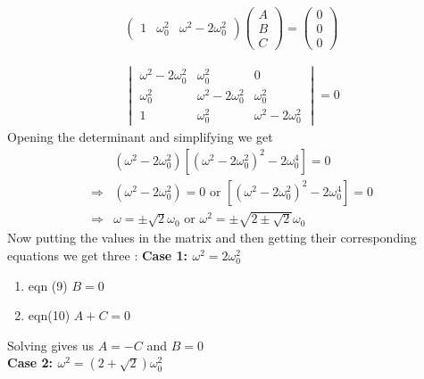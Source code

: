 \documentclass[addpoints]{exam}
\begin{document}
\begin{questions}
\begin{solution}
\begin{align*}
\begin{pmatrix}
            1 & \omega _{0}^{2} & \omega ^{2} -2\omega _{0}^{2}
        \end{pmatrix} 
        \begin{pmatrix}
            A\\
            B\\
            C
        \end{pmatrix}=
        \begin{pmatrix}
            0\\
            0\\
            0
        \end{pmatrix}
        \\ \\ \\
        \begin{vmatrix}
            \omega ^{2} -2\omega _{0}^{2} & \omega _{0}^{2} & 0\\
            \omega _{0}^{2} & \omega ^{2} -2\omega _{0}^{2} & \omega _{0}^{2}\\
            1 & \omega _{0}^{2} & \omega ^{2} -2\omega _{0}^{2}
        \end{vmatrix} =0
    \end{align*}
    Opening the determinant and simplifying we get 
    \begin{align*}
        &(\omega^2-2\omega_0^2)[(\omega^2-2\omega_0^2)^2-2\omega_0^4] = 0\\ 
        \Rightarrow & (\omega^2-2\omega_0^2)=0 \text{  or  } [(\omega^2-2\omega_0^2)^2-2\omega_0^4] = 0\\ 
        \Rightarrow & \omega=\pm\sqrt{2}\omega_0 \text{  or  } \omega^2=\pm \sqrt{2\pm\sqrt{2}}\omega_0
    \end{align*}
    Now putting the values in the matrix and then getting their corresponding equations we get three  :
    \textbf{Case 1: $\omega^2=2\omega_0^2$}\\ 
    \begin{enumerate}
        \item eqn (9) $B=0$
        \item eqn(10) $A+C=0$
    \end{enumerate}
        Solving gives us $A = -C$ and $B=0$\\ 
        \textbf{Case 2: $\omega^2=(2+\sqrt{2})\omega_0^2$}
\end{solution} 

\end{questions}
\end{document}
